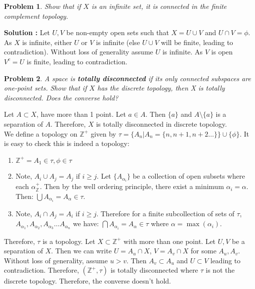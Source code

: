\documentclass{article}
\newtheorem{problem}{Problem}
\numberwithin{problem}{section}
\begin{document}
\begin{tcolorbox}
\begin{problem}
Show that if $X$ is an infinite set, it is connected in the finite complement topology.
\end{problem}
\end{tcolorbox}
\textbf{Solution :}
Let $U,V$ be non-empty open sets such that $X=U\cup V$ and $U\cap V=\phi$. As $X$ is infinite, either $U$ or $V$ is infinite (else $U\cup V$ will be finite, leading to contradiction). Without loss of generality assume $U$ is infinite. As $V$ is open $V^c=U$ is finite, leading to contradiction.


\begin{tcolorbox}
\begin{problem}
 A space is \textbf{totally disconnected} if its only connected subspaces are one-point
sets. Show that if $X$ has the discrete topology, then X is totally disconnected.
Does the converse hold?
\end{problem}
\end{tcolorbox}
Let $A\subset X$, have more than 1 point. Let $a\in A$. Then $\{a\}$ and $A\setminus \{a\}$ is a separation of $A$. Therefore, $X$ is totally disconnected in discrete topology.\\
We define a topology on $\mathbb Z^+$ given by $\tau=\{A_n|A_n=\{n,n+1,n+2\hdots\}\}\cup\{\phi\}$. It is easy to check this is indeed a topology:
\begin{enumerate}
    \item $\mathbb Z^+=A_1\in\tau,\phi\in\tau$
    \item Note, $A_i\cup A_j=A_j$ if $i\geq j$. Let $\{A_{\alpha_i}\}$ be a collection of open subsets where each $\alpha_\mathbb Z^+$. Then by the well ordering principle, there exist a minimum $\alpha_i=\alpha$. Then:
    $\bigcup A_{\alpha_i}=A_\alpha\in\tau$.
    \item Note, $A_i\cap A_j=A_i$ if $i\geq j$. Therefore for a finite subcollection of sets of $\tau$, $A_{\alpha_1},A_{\alpha_2},A_{\alpha_3}\hdots A_{\alpha_n}$ we have:
    $\bigcap A_{\alpha_i}=A_\alpha\in\tau$ where $\alpha=\max(\alpha_i)$.
\end{enumerate}
Therefore, $\tau$ is a topology.
Let $X\subset \mathbb Z^+$ with more than one point. Let $U,V$ be a separation of $X$. Then we can write $U=A_u\cap X$, $V=A_v\cap X$ for some $A_u,A_v$. Without loss of generality, assume $u>v$. Then $A_v\subset A_u$ and $U\subset V$ leading to contradiction. Therefore, $\left(\mathbb Z^+,\tau\right)$ is totally disconnected where $\tau$ is not the discrete topology. Therefore, the converse doesn't hold.
\end{document}
